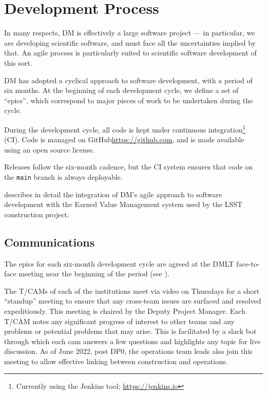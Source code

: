 \section{Development Process} \label{sect:devproc}

In many respects, \gls{DM} is effectively a large software project --- in particular, we are developing scientific software, and must face all the uncertainties implied by that.
An agile process \citep{it:agile} is particularly suited to scientific
software development of this sort.

DM has adopted a cyclical approach to software development, with a period of six months.
At the beginning of each development cycle, we define a set of ``epics'', which correspond to major pieces of work to be undertaken during the cycle.

During the development cycle, all code is kept under continuous integration\footnote{Currently using the Jenkins tool; \url{https://jenkins.io}} (\gls{CI}).
Code is managed on GitHub\url{https://github.com}, and is made available using an open source license.

Releases follow the six-month cadence, but the \gls{CI} system ensures that code on the \texttt{main} branch is always deployable.

 describes in detail the integration of \gls{DM}'s agile approach to software development with the \gls{Earned Value} Management system used by the \gls{LSST} construction project.

\subsection{Communications}

The epics for each six-month development cycle are agreed at the \gls{DMLT} face-to-face meeting near the beginning of the period (see ).

The T/CAMs of each of the institutions meet via video on Thursdays for a short ``standup'' meeting to ensure that any cross-team issues are surfaced and resolved expeditiously.
This meeting is chaired by the Deputy \gls{Project Manager}.
Each \gls{T/CAM} notes any significant progress of interest to other teams and any problems or potential problems that may arise.
This is facilitated by a slack bot through which each cam answers a few questions and highlights any topic for live discussion.
As of June 2022, post DP0, the operations team leads also join this meeting to allow effective linking between construction and operations.

